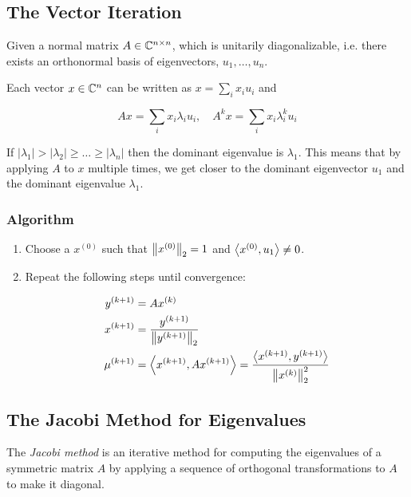 \subsection{The Vector Iteration}

Given a normal matrix \(A \in \mathbb{C}^{n \times n}\), which is unitarily diagonalizable, i.e. there exists an orthonormal basis of 
eigenvectors, \(u_1, \dots, u_n\).

Each vector \(x \in \mathbb{C}^n\) can be written as \(x = \sum_i x_i u_i\) and 

\[
    Ax = \sum_i x_i \lambda_i u_i, \quad A^k x = \sum_i x_i \lambda_i^k u_i
\]

If \(|\lambda_1| > |\lambda_2| \ge \dots \ge |\lambda_n|\) then the dominant eigenvalue is \(\lambda_1\). This 
means that by applying \(A\) to \(x\) multiple times, we get closer to the dominant eigenvector \(u_1\) and the dominant eigenvalue \(\lambda_1\).

\subsubsection{Algorithm}

\begin{enumerate}
    
    \item Choose a \(x^{(0)}\) such that \(\left\| x^{(0)} \right\|_2 = 1\) and \(\left\langle x^{(0)}, u_1\right\rangle \neq 0\).

    \item Repeat the following steps until convergence: 
    
    \begin{align*}
        y^{(k + 1)} &= Ax^{(k)} \\
        x^{(k + 1)} &= \frac{y^{(k + 1)}}{\left\| y^{(k + 1)} \right\|_2} \\ 
        \mu^{(k + 1)} &= \left\langle x^{(k + 1)}, Ax^{(k + 1)}\right\rangle = \frac{\left\langle x^{(k + 1)}, y^{(k + 1)}\right\rangle}{\left\| x^{(k)} \right\|_2^2}
    \end{align*}

\end{enumerate}

\subsection{The Jacobi Method for Eigenvalues}

The \emph{Jacobi method} is an iterative method for computing the eigenvalues of a symmetric matrix \(A\) by applying a sequence 
of orthogonal transformations to \(A\) to make it diagonal. 

